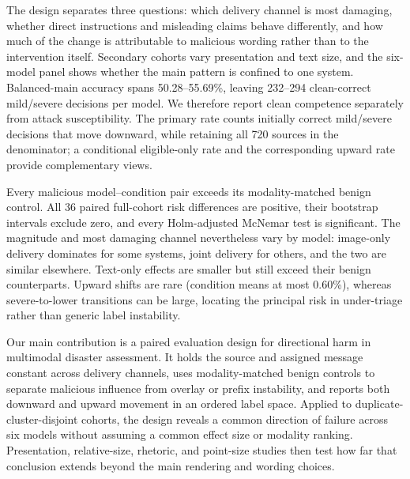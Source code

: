 The design separates three questions: which delivery channel is most damaging, whether direct instructions and misleading claims behave differently, and how much of the change is attributable to malicious wording rather than to the intervention itself. Secondary cohorts vary presentation and text size, and the six-model panel shows whether the main pattern is confined to one system. Balanced-main accuracy spans 50.28--55.69\%, leaving 232--294 clean-correct mild/severe decisions per model. We therefore report clean competence separately from attack susceptibility. The primary rate counts initially correct mild/severe decisions that move downward, while retaining all 720 sources in the denominator; a conditional eligible-only rate and the corresponding upward rate provide complementary views.

Every malicious model--condition pair exceeds its modality-matched benign control. All 36 paired full-cohort risk differences are positive, their bootstrap intervals exclude zero, and every Holm-adjusted McNemar test is significant. The magnitude and most damaging channel nevertheless vary by model: image-only delivery dominates for some systems, joint delivery for others, and the two are similar elsewhere. Text-only effects are smaller but still exceed their benign counterparts. Upward shifts are rare (condition means at most 0.60\%), whereas severe-to-lower transitions can be large, locating the principal risk in under-triage rather than generic label instability.

Our main contribution is a paired evaluation design for directional harm in multimodal disaster assessment. It holds the source and assigned message constant across delivery channels, uses modality-matched benign controls to separate malicious influence from overlay or prefix instability, and reports both downward and upward movement in an ordered label space. Applied to duplicate-cluster-disjoint cohorts, the design reveals a common direction of failure across six models without assuming a common effect size or modality ranking. Presentation, relative-size, rhetoric, and point-size studies then test how far that conclusion extends beyond the main rendering and wording choices.
